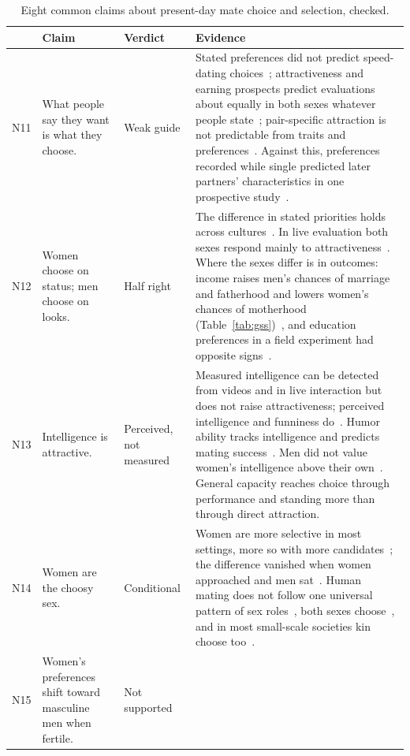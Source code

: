 \begin{table}[t]
\caption{Eight common claims about present-day mate choice and selection, checked.}\label{tab:audittoday}
\scriptsize
\begin{tabularx}{\textwidth}{@{}P{0.028\textwidth}P{0.20\textwidth}P{0.10\textwidth}L@{}}
\toprule
 & Claim & Verdict & Evidence\\
\midrule
N11 & What people say they want is what they choose. & Weak guide &
Stated preferences did not predict speed-dating choices~\cite{todd2007}; attractiveness and earning prospects predict
evaluations about equally in both sexes whatever people state~\cite{eastwick2014}; pair-specific attraction is not predictable
from traits and preferences~\cite{joel2017}. Against this, preferences recorded while single predicted later partners'
characteristics in one prospective study~\cite{gerlach2019}.\\
\addlinespace
N12 & Women choose on status; men choose on looks. & Half right &
The difference in stated priorities holds across cultures~\cite{buss1989,walter2020,li2002}. In live evaluation both sexes
respond mainly to attractiveness~\cite{eastwick2014,egebark2021}. Where the sexes differ is in outcomes: income raises men's chances
of marriage and fatherhood and lowers women's chances of motherhood (Table~\ref{tab:gss})~\cite{nettle2008,hopcroft2021}, and
education preferences in a field experiment had opposite signs~\cite{egebark2021}.\\
\addlinespace
N13 & Intelligence is attractive. & Perceived, not measured &
Measured intelligence can be detected from videos and in live interaction but does not raise attractiveness; perceived
intelligence and funniness do~\cite{driebe2021}. Humor ability tracks intelligence and predicts mating
success~\cite{greengross2011}. Men did not value women's intelligence above their own~\cite{fisman2006}. General capacity reaches
choice through performance and standing more than through direct attraction.\\
\addlinespace
N14 & Women are the choosy sex. & Conditional &
Women are more selective in most settings, more so with more candidates~\cite{fisman2006}; the difference vanished when women
approached and men sat~\cite{finkel2009}. Human mating does not follow one universal pattern of sex roles~\cite{brown2009}, both
sexes choose~\cite{stewartwilliams2013}, and in most small-scale societies kin choose too~\cite{walker2011}.\\
\addlinespace
N15 & Women's preferences shift toward masculine men when fertile. & Not supported &

\end{tabularx}
\end{table}

